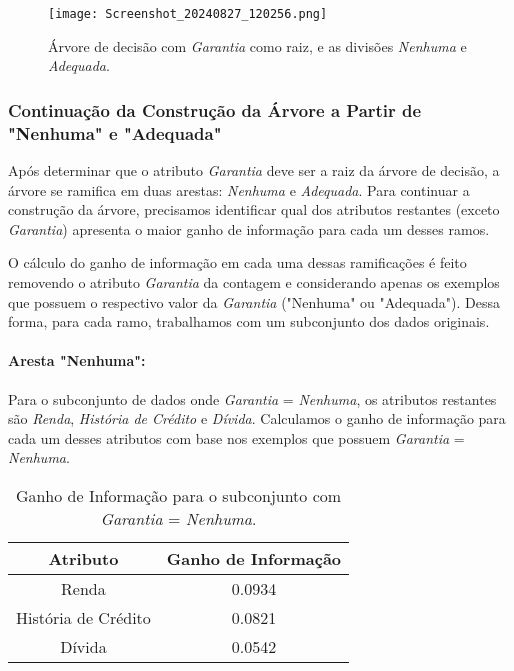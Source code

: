 \documentclass[a4paper,12pt]{article}
\begin{document}
\begin{figure}[H]
\centering
\texttt{[image: Screenshot\_20240827\_120256.png]} %
\caption{Árvore de decisão com \textit{Garantia} como raiz, e as divisões \textit{Nenhuma} e \textit{Adequada}.}
\label{fig:arvore-decisao}
\end{figure}

\subsubsection{Continuação da Construção da Árvore a Partir de "Nenhuma" e "Adequada"}

Após determinar que o atributo \textit{Garantia} deve ser a raiz da árvore de decisão, a árvore se ramifica em duas arestas: \textit{Nenhuma} e \textit{Adequada}. Para continuar a construção da árvore, precisamos identificar qual dos atributos restantes (exceto \textit{Garantia}) apresenta o maior ganho de informação para cada um desses ramos.

O cálculo do ganho de informação em cada uma dessas ramificações é feito removendo o atributo \textit{Garantia} da contagem e considerando apenas os exemplos que possuem o respectivo valor da \textit{Garantia} ("Nenhuma" ou "Adequada"). Dessa forma, para cada ramo, trabalhamos com um subconjunto dos dados originais.

\paragraph{Aresta "Nenhuma":}
Para o subconjunto de dados onde \textit{Garantia} = \textit{Nenhuma}, os atributos restantes são \textit{Renda}, \textit{História de Crédito} e \textit{Dívida}. Calculamos o ganho de informação para cada um desses atributos com base nos exemplos que possuem \textit{Garantia} = \textit{Nenhuma}.

\begin{table}[H]
\centering
\begin{tabular}{|c|c|}
\hline
\textbf{Atributo} & \textbf{Ganho de Informação} \\
\hline
Renda & 0.0934 \\
\hline
História de Crédito & 0.0821 \\
\hline
Dívida & 0.0542 \\
\hline
\end{tabular}
\caption{Ganho de Informação para o subconjunto com \textit{Garantia} = \textit{Nenhuma}.}
\label{tab:ganho-informacao-nenhuma}
\end{table}
\end{document}
